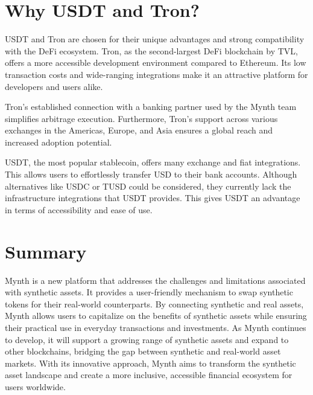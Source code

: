 \hypertarget{why-usdt-and-tron}{%
\section{Why USDT and Tron?}\label{why-usdt-and-tron}}

USDT and Tron are chosen for their unique advantages and strong
compatibility with the DeFi ecosystem. Tron, as the second-largest DeFi
blockchain by TVL, offers a more accessible development environment
compared to Ethereum. Its low transaction costs and wide-ranging
integrations make it an attractive platform for developers and users
alike.

Tron's established connection with a banking partner used by the Mynth
team simplifies arbitrage execution. Furthermore, Tron's support across
various exchanges in the Americas, Europe, and Asia ensures a global
reach and increased adoption potential.

USDT, the most popular stablecoin, offers many exchange and fiat
integrations. This allows users to effortlessly transfer USD to their
bank accounts. Although alternatives like USDC or TUSD could be
considered, they currently lack the infrastructure integrations that
USDT provides. This gives USDT an advantage in terms of accessibility
and ease of use.

\hypertarget{summary}{%
\section{Summary}\label{summary}}

Mynth is a new platform that addresses the challenges and limitations
associated with synthetic assets. It provides a user-friendly mechanism
to swap synthetic tokens for their real-world counterparts. By
connecting synthetic and real assets, Mynth allows users to capitalize
on the benefits of synthetic assets while ensuring their practical use
in everyday transactions and investments. As Mynth continues to develop,
it will support a growing range of synthetic assets and expand to other
blockchains, bridging the gap between synthetic and real-world asset
markets. With its innovative approach, Mynth aims to transform the
synthetic asset landscape and create a more inclusive, accessible
financial ecosystem for users worldwide.
